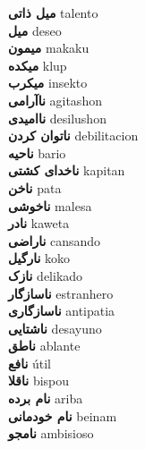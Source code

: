 \textbf{ میل ذاتی  } talento \\
\textbf{ میل  } deseo \\
\textbf{ میمون  } makaku \\
\textbf{ میکده  } klup \\
\textbf{ میکرب  } insekto \\
\textbf{ ناآرامی  } agitashon \\
\textbf{ ناامیدی  } desilushon \\
\textbf{ ناتوان کردن  } debilitacion \\
\textbf{ ناحیه  } bario \\
\textbf{ ناخدای کشتی  } kapitan \\
\textbf{ ناخن  } pata \\
\textbf{ ناخوشی  } malesa \\
\textbf{ نادر  } kaweta \\
\textbf{ ناراضی  } cansando \\
\textbf{ نارگیل  } koko \\
\textbf{ نازک  } delikado \\
\textbf{ ناسازگار  } estranhero \\
\textbf{ ناسازگاری  } antipatia \\
\textbf{ ناشتایی  } desayuno \\
\textbf{ ناطق  } ablante \\
\textbf{ نافع  } útil \\
\textbf{ ناقلا  } bispou \\
\textbf{ نام برده  } ariba \\
\textbf{ نام خودمانی  } beinam \\
\textbf{ نامجو  } ambisioso \\
